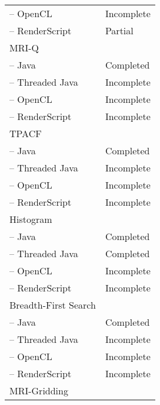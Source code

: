 \begin{table}[h]
\begin{tabular}{ | l | p{2cm} |}
    \hspace{0.5cm}-- OpenCL & Incomplete \\
    \hspace{0.5cm}-- RenderScript & Partial \\ \hline
    MRI-Q & \\
    \hspace{0.5cm}-- Java & Completed \\
    \hspace{0.5cm}-- Threaded Java & Incomplete \\
    \hspace{0.5cm}-- OpenCL & Incomplete \\
    \hspace{0.5cm}-- RenderScript & Incomplete \\ \hline
    TPACF & \\
    \hspace{0.5cm}-- Java & Completed \\
    \hspace{0.5cm}-- Threaded Java & Incomplete \\
    \hspace{0.5cm}-- OpenCL & Incomplete \\
    \hspace{0.5cm}-- RenderScript & Incomplete \\ \hline
    Histogram & \\
    \hspace{0.5cm}-- Java & Completed \\
    \hspace{0.5cm}-- Threaded Java & Completed \\
    \hspace{0.5cm}-- OpenCL & Incomplete \\
    \hspace{0.5cm}-- RenderScript & Incomplete \\ \hline
    Breadth-First Search & \\
    \hspace{0.5cm}-- Java & Completed \\
    \hspace{0.5cm}-- Threaded Java & Incomplete \\
    \hspace{0.5cm}-- OpenCL & Incomplete \\
    \hspace{0.5cm}-- RenderScript & Incomplete \\ \hline
    MRI-Gridding & \\

\end{tabular}
\end{table}
